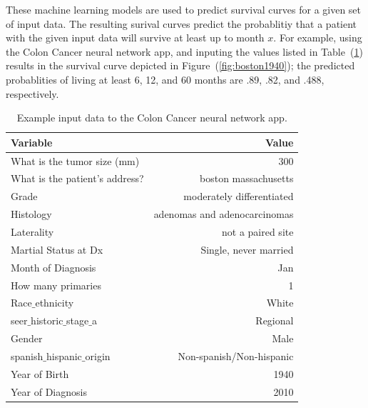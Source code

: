 \documentclass[a4paper,11pt]{article}
\begin{document}
These machine learning models are used to predict survival curves for a given set of input data. 
The resulting surival curves predict the probablitiy that a patient with the given input data will survive at least up to month $x$. For example, using the Colon Cancer neural network app, and 
inputing the values listed in Table~(\ref{tab:boston1940}) results in the survival curve depicted in Figure~(\ref{fig:boston1940}); the predicted probablities of living 
at least 6, 12, and 60 months are .89, .82, and .488, respectively.


\begin{table}[H]
\begin{center}
\begin{tabular}{lr}
\toprule
  Variable  & Value \\ 
\midrule
  What is the tumor size (mm) & 300 \\  
  What is the patient's address? & boston massachusetts \\ 
  Grade & moderately differentiated \\  
  Histology & adenomas and adenocarcinomas \\ 
  Laterality & not a paired site \\  
 Martial Status at Dx & Single, never married \\  
 Month of Diagnosis & Jan \\  
 How many primaries & 1 \\  
  Race$\_$ethnicity & White \\  
  seer$\_$historic$\_$stage$\_$a  & Regional \\ 
  Gender & Male \\  
  spanish$\_$hispanic$\_$origin & Non-spanish/Non-hispanic \\ 
 Year of Birth & 1940 \\  
  Year of Diagnosis & 2010 \\
\bottomrule
\end{tabular}
\caption{Example input data to the Colon Cancer neural network app.}
\label{tab:boston1940}
\end{center}
\end{table}
\end{document}

